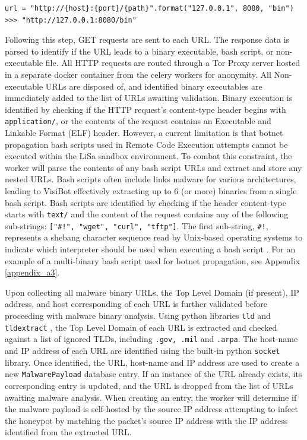 \begin{lstlisting}
url = "http://{host}:{port}/{path}".format("127.0.0.1", 8080, "bin")
>>> "http://127.0.0.1:8080/bin"
\end{lstlisting}

Following this step, GET requests are sent to each URL. The response data is parsed to identify if the URL leads to a binary executable, bash script, or non-executable file. All HTTP requests are routed through a Tor Proxy server hosted in a separate docker container from the celery workers for anonymity. All Non-executable URLs are disposed of, and identified binary executables are immediately added to the list of URLs awaiting validation. Binary execution is identified by checking if the HTTP request's content-type header begins with \texttt{application/}, or the contents of the request contains an Executable and Linkable Format (ELF) header. However, a current limitation is that botnet propagation bash scripts used in Remote Code Execution attempts cannot be executed within the LiSa sandbox environment. To combat this constraint, the worker will parse the contents of any bash script URLs and extract and store any nested URLs. Bash scripts often include links malware for various architectures, leading to VisiBot effectively extracting up to 6 (or more) binaries from a single bash script. Bash scripts are identified by checking if the header content-type starts with \texttt{text/} and the content of the request contains any of the following sub-strings: \texttt{["\#!", "wget", "curl", "tftp"]}. The first sub-string, \texttt{\#!}, represents a shebang character sequence read by Unix-based operating systems to indicate which interpreter should be used when executing a bash script \citep{Shebang}. For an example of a multi-binary bash script used for botnet propagation, see Appendix \ref{appendix_a3}.

Upon collecting all malware binary URLs, the Top Level Domain (if present), IP address, and host corresponding of each URL is further validated before proceeding with malware binary analysis. Using python libraries \texttt{tld} and \texttt{tldextract} \citep{TLD, TLDExtract}, the Top Level Domain of each URL is extracted and checked against a list of ignored TLDs, including \texttt{.gov, .mil} and \texttt{.arpa}. The host-name and IP address of each URL are identified using the built-in python \texttt{socket} library. \citep{PythonSocket} Once identified, the URL, host-name and IP address are used to create a new \texttt{MalwarePayload} database entry. If an instance of the URL already exists, its corresponding entry is updated, and the URL is dropped from the list of URLs awaiting malware analysis. When creating an entry, the worker will determine if the malware payload is self-hosted by the source IP address attempting to infect the honeypot by matching the packet's source IP address with the IP address identified from the extracted URL. 

